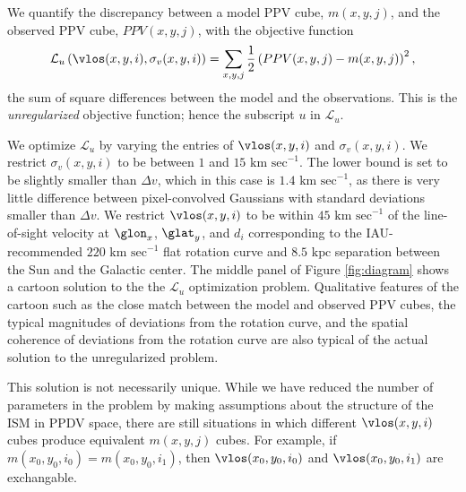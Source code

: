 We quantify the discrepancy between a model PPV cube, $m(x, y, j)$, and the observed PPV cube, $PPV(x, y, j)$, with the objective function
\begin{equation}
  \label{eqn:obj_unreg}
  \mathcal{L}_u \left(\vlos(x, y, i), \sigma_v(x, y, i) \right) = 
  \sum_{x, y, j} \frac{1}{2} \left(PPV(x, y, j) -  m(x, y, j)\right)^2,
\end{equation}
the sum of square differences between the model and the observations. 
This is the \emph{unregularized} objective function; hence the subscript $u$ in $\mathcal{L}_u$.

We optimize $\mathcal{L}_u$ by varying the entries of $\vlos(x, y, i)$ and $\sigma_v(x, y, i)$. 
We restrict $\sigma_v(x, y, i)$ to be between $1$ and $15\text{ km sec}^{-1}$. 
The lower bound is set to be slightly smaller than $\Delta v$, which in this case is $1.4 \text{ km sec}^{-1}$, as there is very little difference between pixel-convolved Gaussians with standard deviations smaller than $\Delta v$. 
We restrict $\vlos(x, y, i)$ to be within $45 \text{ km sec}^{-1}$ of the line-of-sight velocity at $\glon_x$, $\glat_y$, and $d_i$ corresponding to the IAU-recommended $220 \text{ km sec}^{-1}$ flat rotation curve and $8.5 \text{ kpc}$ separation between the Sun and the Galactic center.
The middle panel of Figure \ref{fig:diagram} shows a cartoon solution to the the $\mathcal{L}_u$ optimization problem. 
Qualitative features of the cartoon such as the close match between the model and observed PPV cubes, the typical magnitudes of deviations from the rotation curve, and the spatial coherence of deviations from the rotation curve are also typical of the actual solution to the unregularized problem.

This solution is not necessarily unique. 
While we have reduced the number of parameters in the problem by making assumptions about the structure of the ISM in PPDV space, there are still situations in which different $\vlos(x, y, i)$ cubes produce equivalent $m(x, y, j)$ cubes. 
For example, if $m(x_0, y_0, i_0) = m(x_0, y_0, i_1)$, then $\vlos(x_0, y_0, i_0)$ and $\vlos(x_0, y_0, i_1)$ are exchangable.

